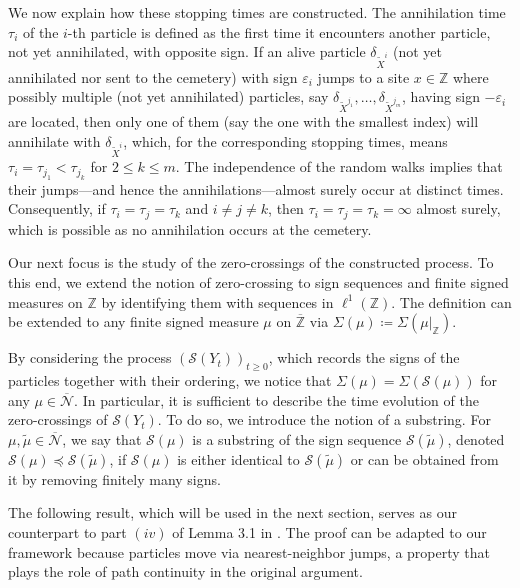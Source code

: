 \documentclass[12pt,reqno,oneside]{amsart}
\numberwithin{equation}{section}
\theoremstyle{definition}
\theoremstyle{remark}
\newcommand{\Z}{\mathbb{Z}}
\newcommand{\OZ}{\overline{\mathbb{Z}}}
\begin{document}
We now explain how these stopping times are constructed. The annihilation
time $\tau_i$ of the $i$-th particle is defined as the first time it
encounters another particle, not yet annihilated, with opposite sign. If an
alive particle $\delta_{\tilde{X}^i}$ (not yet annihilated nor sent to the
  cemetery) with sign $\varepsilon_i$ jumps to a site $x \in \Z$ where
possibly multiple (not yet annihilated) particles, say
$\delta_{\tilde{X}^{j_1}},\dots,\delta_{\tilde{X}^{j_m}}$, having sign
$-\varepsilon_i$ are located, then only one of them (say the one with the
  smallest index) will annihilate with $\delta_{\tilde{X}^i}$, which, for the
corresponding stopping times, means $\tau_i=\tau_{j_1} < \tau_{j_k}$ for
$2 \leq k \leq m$. The independence of the random walks implies that their
jumps---and hence the annihilations---almost surely occur at distinct times.
Consequently, if $\tau_i = \tau_j  = \tau_k $ and $i \neq j \neq k$, then
$\tau_i=\tau_j  = \tau_k=\infty$ almost surely, which is possible as no
annihilation occurs at the cemetery.

Our next focus is the study of the zero-crossings of the constructed process.
To this end, we extend the notion of zero-crossing to sign sequences and
finite signed measures on $\Z$ by identifying them with sequences in $\ell^1(\Z)$.
The definition can be extended to any finite signed measure $\mu$ on $\OZ$
via $\Sigma(\mu) \coloneq \Sigma(\mu|_{\mathbb{Z}})$.

By considering the process $(\mathcal{S}(Y_t))_{t \geq 0}$, which  records
the signs of the particles together with their ordering, we notice that
$\Sigma(\mu) = \Sigma(\mathcal{S}(\mu))$ for any
$\mu \in \overline{\mathcal{N}}$. In particular, it is sufficient to describe
the time evolution of the zero-crossings of $\mathcal{S}(Y_t)$. To do so, we
introduce the notion of a substring. For
$\mu, \tilde{\mu} \in \overline{\mathcal{N}}$, we say that $\mathcal{S}(\mu)$
is a substring of the sign sequence $\mathcal{S}(\tilde{\mu})$, denoted
$\mathcal{S}(\mu) \preceq \mathcal{S}(\tilde{\mu})$, if $\mathcal{S}(\mu)$ is
either identical to $\mathcal{S}(\tilde{\mu})$ or can be obtained from it by
removing finitely many signs.

The following result, which will be used in the next section, serves as our
counterpart to part $(iv)$ of Lemma 3.1 in \cite{EW99}. The
  proof can be adapted to our framework because particles move via
nearest-neighbor jumps, a property that plays the role of path continuity in
the original argument.
\end{document}
